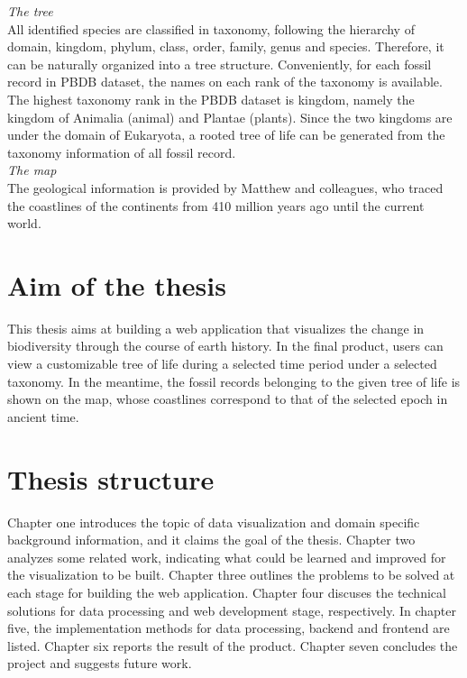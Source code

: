 \documentclass[11pt, a4paper,oneside,chapterprefix=false]{scrbook}
\begin{document}
\noindent \emph{The tree}\\
All identified species are classified in taxonomy, following the hierarchy of domain, kingdom, phylum, class, order, family, genus and species. Therefore, it can be naturally organized into a tree structure. Conveniently, for each fossil record in PBDB dataset, the names on each rank of the taxonomy is available. The highest taxonomy rank in the PBDB dataset is kingdom, namely the kingdom of Animalia (animal) and Plantae (plants). Since the two kingdoms are under the domain of Eukaryota, a rooted tree of life can be generated from the taxonomy information of all fossil record.\\

\noindent \emph{The map}\\
The geological information is provided by Matthew and colleagues, who traced the coastlines of the continents from 410 million years ago until the current world. 

\section{Aim of the thesis}
This thesis aims at building a web application that visualizes the change in biodiversity through the course of earth history. In the final product, users can view a customizable tree of life during a selected time period under a selected taxonomy. In the meantime, the fossil records belonging to the given tree of life is shown on the map, whose coastlines correspond to that of the selected epoch in ancient time. 

\section{Thesis structure}
Chapter one introduces the topic of data visualization and domain specific background information, and it claims the goal of the thesis. Chapter two analyzes some related work, indicating what could be learned and improved for the visualization to be built. Chapter three outlines the problems to be solved at each stage for building the web application. Chapter four discuses the technical solutions for data processing and web development stage, respectively. In chapter five, the implementation methods for data processing, backend and frontend are listed. Chapter six reports the result of the product. Chapter seven concludes the project and suggests future work.


\end{document}

